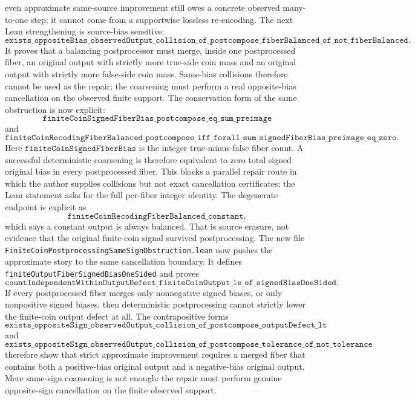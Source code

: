 \documentclass[11pt]{article}
\theoremstyle{remark}
\begin{document}
even approximate same-source improvement still owes a concrete observed
many-to-one step; it cannot come from a supportwise lossless re-encoding.  The next Lean
strengthening is source-bias sensitive:
\[
  \texttt{exists\_oppositeBias\_observedOutput\_collision\_of\_postcompose\_fiberBalanced\_of\_not\_fiberBalanced}.
\]
It proves that a balancing postprocessor must merge, inside one postprocessed
fiber, an original output with strictly more true-side coin mass and an
original output with strictly more false-side coin mass.  Same-bias collisions
therefore cannot be used as the repair; the coarsening must perform a real
opposite-bias cancellation on the observed finite support.  The conservation
form of the same obstruction is now explicit:
\[
  \texttt{finiteCoinSignedFiberBias\_postcompose\_eq\_sum\_preimage}
\]
and
\[
  \texttt{finiteCoinRecodingFiberBalanced\_postcompose\_iff\_forall\_sum\_signedFiberBias\_preimage\_eq\_zero}.
\]
Here \(\texttt{finiteCoinSignedFiberBias}\) is the integer true-minus-false
fiber count.  A successful deterministic coarsening is therefore equivalent to
zero total signed original bias in every postprocessed fiber.  This blocks a
parallel repair route in which the author supplies collisions but not exact
cancellation certificates: the Lean statement asks for the full per-fiber
integer identity.  The degenerate endpoint is explicit
as
\[
  \texttt{finiteCoinRecodingFiberBalanced\_constant},
\]
which says a constant output is always balanced.  That is source erasure, not
evidence that the original finite-coin signal survived postprocessing.
The new file \texttt{FiniteCoinPostprocessingSameSignObstruction.lean} now
pushes the approximate story to the same cancellation boundary.  It defines
\texttt{finiteOutputFiberSignedBiasOneSided} and proves
\[
  \texttt{countIndependentWithinOutputDefect\_finiteCoinOutput\_le\_of\_signedBiasOneSided}.
\]
If every postprocessed fiber merges only nonnegative signed biases, or only
nonpositive signed biases, then deterministic postprocessing cannot strictly
lower the finite-coin output defect at all.  The contrapositive forms
\[
  \texttt{exists\_oppositeSign\_observedOutput\_collision\_of\_postcompose\_outputDefect\_lt}
\]
and
\[
  \texttt{exists\_oppositeSign\_observedOutput\_collision\_of\_postcompose\_tolerance\_of\_not\_tolerance}
\]
therefore show that strict approximate improvement requires a merged fiber that
contains both a positive-bias original output and a negative-bias original
output.  Mere same-sign coarsening is not enough: the repair must perform
genuine opposite-sign cancellation on the finite observed support.
\end{document}
